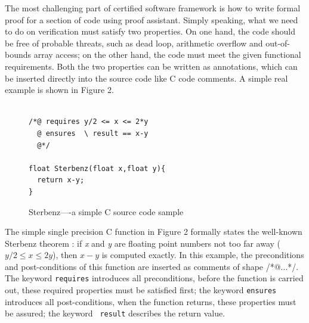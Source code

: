 \documentclass[10pt, conference, compsocconf]{IEEEtran}
\begin{document}
The most challenging part of certified software framework is how to write formal proof for a section of code using proof assistant. Simply speaking, what we need to do on verification must satisfy two properties. On one hand, the code should be free of probable threats, such as dead loop, arithmetic overflow and out-of-bounds array access; on the other hand, the code must meet the given functional requirements. Both the two properties can be written as annotations, which can be inserted directly into the source code like C code comments. A simple real example is shown in Figure 2.






\begin{figure}[H]
\begin{lstlisting}[label=Csource]

/*@ requires y/2 <= x <= 2*y
  @ ensures  \ result == x-y
  @*/

float Sterbenz(float x,float y){
  return x-y;
}
\end{lstlisting}    
\caption{Sterbenz----a simple C source code sample}
\end{figure}


The simple single precision C function in Figure 2 formally states the well-known Sterbenz theorem \cite{sterbenz}: if \emph{x} and \emph{y} are floating point numbers not too far away ($y/2 \le x \le 2y$), then $x-y$ is computed exactly. In this example, the preconditions and post-conditions of this function are inserted as comments of shape /*@...*/. The keyword \texttt{requires} introduces all preconditions, before the function is carried out, these required properties must be satisfied first; the keyword \texttt{ensures} introduces all post-conditions, when the function returns, these properties must be assured; the keyword \texttt{ result} describes the return value.
\end{document}
